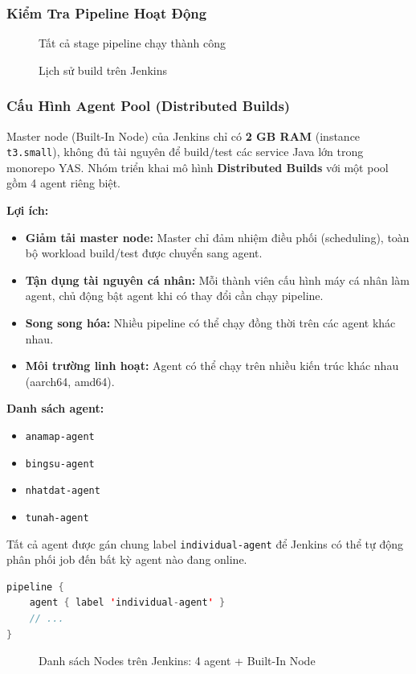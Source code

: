 \subsubsection{Kiểm Tra Pipeline Hoạt Động}

\begin{figure}[H]
\centering
{}
\caption{Tất cả stage pipeline chạy thành công}
\end{figure}

\begin{figure}[H]
\centering
{}
\caption{Lịch sử build trên Jenkins}
\end{figure}

\subsubsection{Cấu Hình Agent Pool (Distributed Builds)}

Master node (Built-In Node) của Jenkins chỉ có \textbf{2 GB RAM} (instance \texttt{t3.small}), không đủ tài nguyên để build/test các service Java lớn trong monorepo YAS. Nhóm triển khai mô hình \textbf{Distributed Builds} với một pool gồm 4 agent riêng biệt.

\textbf{Lợi ích:}
\begin{itemize}
    \item \textbf{Giảm tải master node:} Master chỉ đảm nhiệm điều phối (scheduling), toàn bộ workload build/test được chuyển sang agent.
    \item \textbf{Tận dụng tài nguyên cá nhân:} Mỗi thành viên cấu hình máy cá nhân làm agent, chủ động bật agent khi có thay đổi cần chạy pipeline.
    \item \textbf{Song song hóa:} Nhiều pipeline có thể chạy đồng thời trên các agent khác nhau.
    \item \textbf{Môi trường linh hoạt:} Agent có thể chạy trên nhiều kiến trúc khác nhau (aarch64, amd64).
\end{itemize}

\textbf{Danh sách agent:}
\begin{itemize}
    \item \texttt{anamap-agent}
    \item \texttt{bingsu-agent}
    \item \texttt{nhatdat-agent}
    \item \texttt{tunah-agent}
\end{itemize}

Tất cả agent được gán chung label \texttt{individual-agent} để Jenkins có thể tự động phân phối job đến bất kỳ agent nào đang online.

\begin{lstlisting}[language=Java, caption={Cấu hình agent label trong Jenkinsfile}]
pipeline {
    agent { label 'individual-agent' }
    // ...
}
\end{lstlisting}

\begin{figure}[H]
\centering
{}
\caption{Danh sách Nodes trên Jenkins: 4 agent + Built-In Node}
\end{figure}
